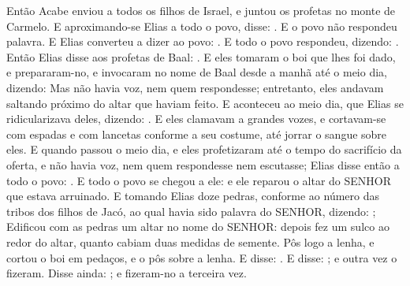 {  Então Acabe enviou a todos os filhos de Israel, e juntou os profetas no monte de Carmelo.
  E aproximando-se Elias a todo o povo, disse: . E o povo não respondeu palavra.
  E Elias converteu a dizer ao povo: . E todo o povo respondeu, dizendo: .
  Então Elias disse aos profetas de Baal: .
  E eles tomaram o boi que lhes foi dado, e prepararam-no, e invocaram no nome de Baal desde a manhã até o meio dia, dizendo:  Mas não havia voz, nem quem respondesse; entretanto, eles andavam saltando próximo do altar que haviam feito.
  E aconteceu ao meio dia, que Elias se ridicularizava deles, dizendo: .
  E eles clamavam a grandes vozes, e cortavam-se com espadas e com lancetas conforme a seu costume, até jorrar o sangue sobre eles.
  E quando passou o meio dia, e eles profetizaram até o tempo do sacrifício da oferta, e não havia voz, nem quem respondesse nem escutasse;
  Elias disse então a todo o povo: . E todo o povo se chegou a ele: e ele reparou o altar do SENHOR que estava arruinado.
  E tomando Elias doze pedras, conforme ao número das tribos dos filhos de Jacó, ao qual havia sido palavra do SENHOR, dizendo: ;
  Edificou com as pedras um altar no nome do SENHOR: depois fez um sulco ao redor do altar, quanto cabiam duas medidas de semente. %
  Pôs logo a lenha, e cortou o boi em pedaços, e o pôs sobre a lenha.
  E disse: . E disse: ; e outra vez o fizeram. Disse ainda: ; e fizeram-no a terceira vez.
}

